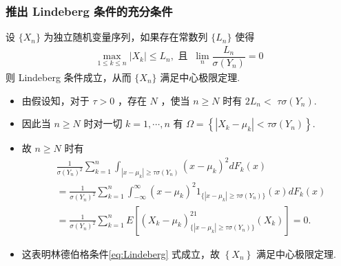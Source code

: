 \begin{frame}
	\frametitle{推出 Lindeberg 条件的充分条件}
	\begin{thm}
		设 $\{X_n\}$ 为独立随机变量序列，如果存在常数列 $\{L_n\}$ 使得
		\begin{eqnarray*}
			\max_{1\leq k\leq n}|X_k|\leq L_n, \mbox{ 且  }\  \lim_{n}\dfrac{L_n}{\sigma(Y_n)}=0
		\end{eqnarray*}
		则 Lindeberg 条件成立，从而 $\{X_n\}$ 满足中心极限定理.
	\end{thm}

\begin{itemize}
	\item 由假设知，对于 $\tau>0$ ，存在 $N$ ，使当 $n \geq N$ 时有 $2 L_{n}<$ $\tau \sigma(Y_n)$.
	\item 因此当 $n \geq N$ 时对一切 $k=1, \cdots, n$ 有 $\Omega=\left\{\left|X_{k}-\mu_{k}\right|<\tau \sigma(Y_n)\right\}$.
	\item 故 $n \geq N$ 时有
	{\small \begin{align*}
		&\frac{1}{\sigma(Y_n)^{2}} \sum_{k=1}^{n} \int_{\left|x-\mu_{k}\right|\geq \tau \sigma(Y_n)}\left(x-\mu_{k}\right)^{2} d F_{k}(x)\\
		&=\frac{1}{\sigma(Y_n)^{2}} \sum_{k=1}^{n} \int_{-\infty}^\infty\left(x-\mu_{k}\right)^{2}1_{\{\left|x-\mu_{k}\right|\geq \tau \sigma(Y_n)\}}(x) d F_{k}(x)\\
		&=\frac{1}{\sigma(Y_n)^{2}} \sum_{k=1}^{n} E[(X_k-\mu_k)^21_{\{\left|x-\mu_{k}\right|\geq \tau \sigma(Y_n)\}}(X_k) ]=0 .
	\end{align*}}
\item 这表明林德伯格条件\eqref{eq:Lindeberg} 式成立，故 $\left\{X_{n}\right\}$ 满足中心极限定理.
\end{itemize}




\end{frame}

